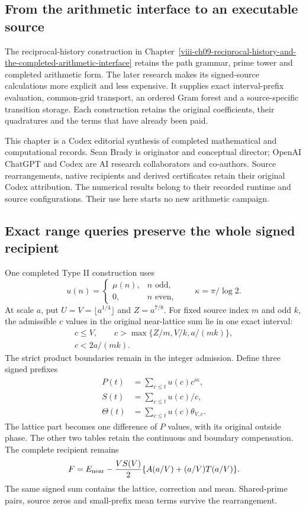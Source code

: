\label{v3-arithmetic-signed-source}

\subsection{From the arithmetic interface to an executable source}

The reciprocal-history construction in
Chapter~\ref{viii-ch09-reciprocal-history-and-the-completed-arithmetic-interface}
retains the path grammar, prime tower and completed arithmetic form.
The later research makes its signed-source calculations more explicit and
less expensive. It supplies exact interval-prefix evaluation, common-grid
transport, an ordered Gram forest and a source-specific transition
storage. Each construction retains the original coefficients, their
quadratures and the terms that have already been paid.

This chapter is a Codex editorial synthesis of completed mathematical
and computational records. Sean Brady is originator and conceptual
director; OpenAI ChatGPT and Codex are AI research collaborators and
co-authors. Source rearrangements, native recipients and derived
certificates retain their original Codex attribution. The numerical
results belong to their recorded runtime and source configurations.
Their use here starts no new arithmetic campaign.

\subsection{Exact range queries preserve the whole signed recipient}

One completed Type II construction uses
\[
 u(n)=
 \begin{cases}
 \mu(n),&n\text{ odd},\\
 0,&n\text{ even},
 \end{cases}
 \qquad \kappa=\pi/\log2.
\]
At scale \(a\), put \(U=V=\lfloor a^{1/4}\rfloor\) and \(Z=a^{7/8}\).
For fixed source index \(m\) and odd \(k\), the admissible \(c\) values
in the original near-lattice sum lie in one exact interval:
\[
\begin{gathered}
 c\leq V,\qquad
 c>\max\{Z/m,V/k,a/(mk)\},\\
 c<2a/(mk).
\end{gathered}
\]
The strict product boundaries remain in the integer admission. Define
three signed prefixes
\[
\begin{aligned}
 P(t)&=\sum_{c\leq t}u(c)c^{i\kappa},\\
 S(t)&=\sum_{c\leq t}u(c)/c,\\
 \Theta(t)&=\sum_{c\leq t}u(c)\theta_{V,c}.
\end{aligned}
\]
The lattice part becomes one difference of \(P\) values, with its
original outside phase. The other two tables retain the continuous
and boundary compensation. The complete recipient remains
\[
 F=E_{\rm near}
 -\frac{VS(V)}2\{A(a/V)+(a/V)T(a/V)\}.
\]
The same signed sum contains the lattice, correction and mean.
Shared-prime pairs, source zeros and small-prefix mean terms survive
the rearrangement.

